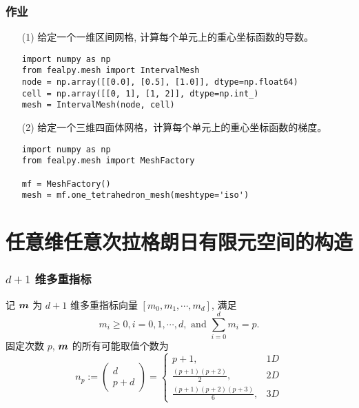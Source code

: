 \documentclass{beamer}
\numberwithin{subsection}{section}
\begin{document}
\begin{frame}[fragile]
    \frametitle{作业}
    \begin{itemize}
        \item[(1)] 给定一个一维区间网格, 计算每个单元上的重心坐标函数的导数。
{\tiny
            \begin{verbatim}
import numpy as np
from fealpy.mesh import IntervalMesh
node = np.array([[0.0], [0.5], [1.0]], dtype=np.float64)
cell = np.array([[0, 1], [1, 2]], dtype=np.int_)
mesh = IntervalMesh(node, cell)
            \end{verbatim}
}
        \item[(2)] 给定一个三维四面体网格，计算每个单元上的重心坐标函数的梯度。
{\tiny
            \begin{verbatim}
import numpy as np
from fealpy.mesh import MeshFactory 

mf = MeshFactory()
mesh = mf.one_tetrahedron_mesh(meshtype='iso')
            \end{verbatim}
}
    \end{itemize}
\end{frame}

\section{任意维任意次拉格朗日有限元空间的构造}

\begin{frame}
    \frametitle{$d+1$ 维多重指标}
    记 ${\boldsymbol m}$ 为 $d+1$  维多重指标向量 $[m_0, m_1, \cdots, m_d]$, 满足  
\begin{equation*}
    m_i \geq 0, i=0, 1, \cdots, d, \text{ and } \sum_{i=0}^d m_i=p.
\end{equation*}
固定次数 $p$, ${\boldsymbol m}$ 的所有可能取值个数为 
\begin{equation*}
    n_p := \begin{pmatrix}
        d \\ p+d 
    \end{pmatrix}
    =\begin{cases}
        p+1, & 1D\\
        \frac{(p+1)(p+2)}{2}, & 2D\\
        \frac{(p+1)(p+2)(p+3)}{6}, & 3D
    \end{cases}
\end{equation*}
\end{frame}
\end{document}
